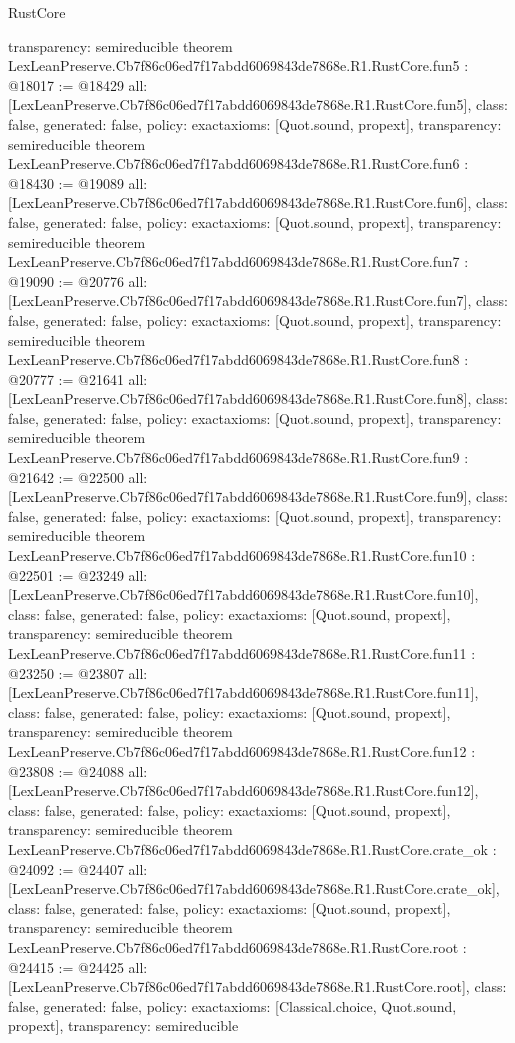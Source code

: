 \begin{lexlean}{RustCore}
\begin{coremodule}
{  transparency: semireducible
}
theorem LexLeanPreserve.Cb7f86c06ed7f17abdd6069843de7868e.R1.RustCore.fun5 : @18017 := @18429 {
  all: [LexLeanPreserve.Cb7f86c06ed7f17abdd6069843de7868e.R1.RustCore.fun5],
  class: false,
  generated: false,
  policy: exact{axioms: [Quot.sound, propext]},
  transparency: semireducible
}
theorem LexLeanPreserve.Cb7f86c06ed7f17abdd6069843de7868e.R1.RustCore.fun6 : @18430 := @19089 {
  all: [LexLeanPreserve.Cb7f86c06ed7f17abdd6069843de7868e.R1.RustCore.fun6],
  class: false,
  generated: false,
  policy: exact{axioms: [Quot.sound, propext]},
  transparency: semireducible
}
theorem LexLeanPreserve.Cb7f86c06ed7f17abdd6069843de7868e.R1.RustCore.fun7 : @19090 := @20776 {
  all: [LexLeanPreserve.Cb7f86c06ed7f17abdd6069843de7868e.R1.RustCore.fun7],
  class: false,
  generated: false,
  policy: exact{axioms: [Quot.sound, propext]},
  transparency: semireducible
}
theorem LexLeanPreserve.Cb7f86c06ed7f17abdd6069843de7868e.R1.RustCore.fun8 : @20777 := @21641 {
  all: [LexLeanPreserve.Cb7f86c06ed7f17abdd6069843de7868e.R1.RustCore.fun8],
  class: false,
  generated: false,
  policy: exact{axioms: [Quot.sound, propext]},
  transparency: semireducible
}
theorem LexLeanPreserve.Cb7f86c06ed7f17abdd6069843de7868e.R1.RustCore.fun9 : @21642 := @22500 {
  all: [LexLeanPreserve.Cb7f86c06ed7f17abdd6069843de7868e.R1.RustCore.fun9],
  class: false,
  generated: false,
  policy: exact{axioms: [Quot.sound, propext]},
  transparency: semireducible
}
theorem LexLeanPreserve.Cb7f86c06ed7f17abdd6069843de7868e.R1.RustCore.fun10 : @22501 := @23249 {
  all: [LexLeanPreserve.Cb7f86c06ed7f17abdd6069843de7868e.R1.RustCore.fun10],
  class: false,
  generated: false,
  policy: exact{axioms: [Quot.sound, propext]},
  transparency: semireducible
}
theorem LexLeanPreserve.Cb7f86c06ed7f17abdd6069843de7868e.R1.RustCore.fun11 : @23250 := @23807 {
  all: [LexLeanPreserve.Cb7f86c06ed7f17abdd6069843de7868e.R1.RustCore.fun11],
  class: false,
  generated: false,
  policy: exact{axioms: [Quot.sound, propext]},
  transparency: semireducible
}
theorem LexLeanPreserve.Cb7f86c06ed7f17abdd6069843de7868e.R1.RustCore.fun12 : @23808 := @24088 {
  all: [LexLeanPreserve.Cb7f86c06ed7f17abdd6069843de7868e.R1.RustCore.fun12],
  class: false,
  generated: false,
  policy: exact{axioms: [Quot.sound, propext]},
  transparency: semireducible
}
theorem LexLeanPreserve.Cb7f86c06ed7f17abdd6069843de7868e.R1.RustCore.crate_ok : @24092 := @24407 {
  all: [LexLeanPreserve.Cb7f86c06ed7f17abdd6069843de7868e.R1.RustCore.crate_ok],
  class: false,
  generated: false,
  policy: exact{axioms: [Quot.sound, propext]},
  transparency: semireducible
}
theorem LexLeanPreserve.Cb7f86c06ed7f17abdd6069843de7868e.R1.RustCore.root : @24415 := @24425 {
  all: [LexLeanPreserve.Cb7f86c06ed7f17abdd6069843de7868e.R1.RustCore.root],
  class: false,
  generated: false,
  policy: exact{axioms: [Classical.choice, Quot.sound, propext]},
  transparency: semireducible
}


\end{coremodule}
\end{lexlean}
